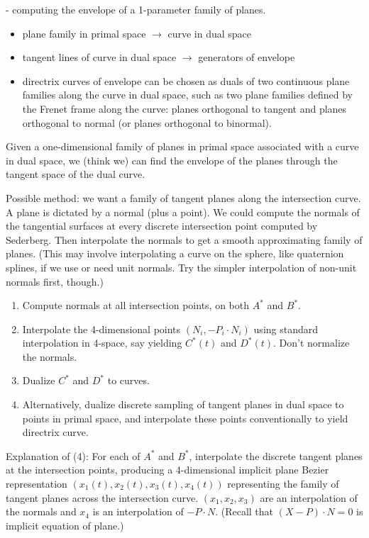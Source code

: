 - computing the envelope of a 1-parameter family of planes.
\begin{itemize}
\item plane family in primal space $\rightarrow$ curve in dual space
\item tangent lines of curve in dual space $\rightarrow$ 
      generators of envelope
\item directrix curves of envelope can be chosen as duals of two continuous
      plane families along the curve in dual space, 
      such as two plane families defined by the Frenet frame along the curve:
      planes orthogonal to tangent and planes orthogonal to normal
      (or planes orthogonal to binormal).
\end{itemize}

Given a one-dimensional family of planes in primal space 
associated with a curve in dual space, we (think we) can find the envelope
of the planes through the tangent space of the dual curve.

Possible method: we want a family of tangent planes along the intersection
	curve.  A plane is dictated by a normal (plus a point).
	We could compute the normals of the tangential surfaces at every
	discrete intersection point computed by Sederberg.
	Then interpolate the normals to get a smooth approximating family of planes.
	(This may involve interpolating a curve on the sphere, like quaternion
	splines, if we use or need unit normals.
	Try the simpler interpolation of non-unit normals first, though.)

\begin{enumerate}
\item Compute normals at all intersection points, on both $A^*$ and $B^*$.
\item Interpolate the 4-dimensional points
	$(N_i, -P_i \cdot N_i)$ using standard interpolation in 4-space,
	say yielding $C^*(t)$ and $D^*(t)$.
	Don't normalize the normals.
\item Dualize $C^*$ and $D^*$ to curves.
\item Alternatively, dualize discrete sampling of tangent planes in dual space
	to points in primal space, and interpolate these points conventionally
	to yield directrix curve.
\end{enumerate}
Explanation of (4):
	For each of $A^*$ and $B^*$,
	interpolate the discrete tangent planes at the intersection points,
	producing a 4-dimensional implicit plane Bezier representation
	$(x_1(t), x_2(t), x_3(t), x_4(t))$ representing the family
	of tangent planes across the intersection curve.
	$(x_1,x_2,x_3)$ are an interpolation of the normals
	and $x_4$ is an interpolation of $-P \cdot N$.
	(Recall that $(X - P) \cdot N = 0$ is implicit equation of plane.)


